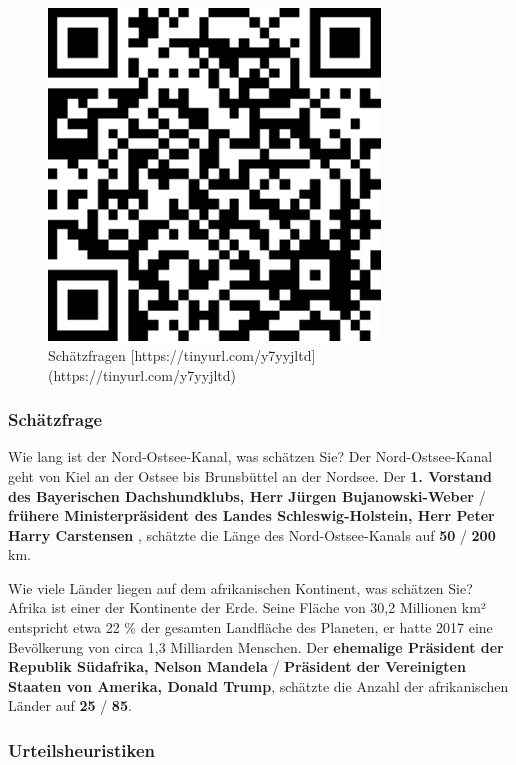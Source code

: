 \documentclass[
]{book}
\begin{document}
\begin{figure}

{\centering \includegraphics[width=250pt]{imgs/AnkerAutoritaet} 

}

\caption{Schätzfragen [https://tinyurl.com/y7yyjltd](https://tinyurl.com/y7yyjltd)}\label{fig:unnamed-chunk-8}
\end{figure}

\hypertarget{schuxe4tzfrage}{%
\subsubsection{Schätzfrage}\label{schuxe4tzfrage}}

Wie lang ist der Nord-Ostsee-Kanal, was schätzen Sie? Der Nord-Ostsee-Kanal geht von Kiel an der Ostsee bis Brunsbüttel an der Nordsee. Der \textbf{1. Vorstand des Bayerischen Dachshundklubs, Herr Jürgen Bujanowski-Weber} / \textbf{frühere Ministerpräsident des Landes Schleswig-Holstein, Herr Peter Harry Carstensen} , schätzte die Länge des Nord-Ostsee-Kanals auf \textbf{50} / \textbf{200} km. \medskip

Wie viele Länder liegen auf dem afrikanischen Kontinent, was schätzen Sie? Afrika ist einer der Kontinente der Erde. Seine Fläche von 30,2 Millionen km² entspricht etwa 22 \% der gesamten Landfläche des Planeten, er hatte 2017 eine Bevölkerung von circa 1,3 Milliarden Menschen. Der \textbf{ehemalige Präsident der Republik Südafrika, Nelson Mandela} / \textbf{Präsident der Vereinigten Staaten von Amerika, Donald Trump}, schätzte die Anzahl der afrikanischen Länder auf \textbf{25} / \textbf{85}.

\hypertarget{urteilsheuristiken}{%
\subsubsection{Urteilsheuristiken}\label{urteilsheuristiken}}
\end{document}
